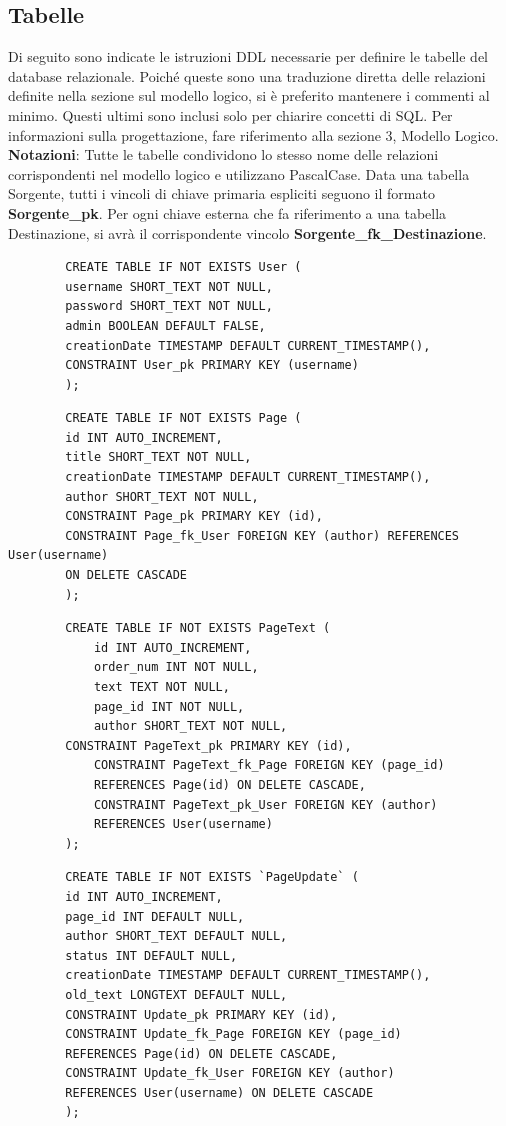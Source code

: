 \documentclass{article}
\begin{document}
	\subsection{Tabelle}
	Di seguito sono indicate le istruzioni DDL necessarie per definire le
	tabelle del database relazionale. Poiché queste sono una traduzione diretta delle
	relazioni definite nella sezione sul modello logico, si è preferito mantenere i
	commenti al minimo. Questi ultimi sono inclusi solo per chiarire concetti di SQL.
	Per informazioni sulla progettazione, fare riferimento alla sezione 3, Modello Logico.
	\\
	\textbf{Notazioni}: Tutte le tabelle condividono lo stesso nome delle relazioni
	corrispondenti nel modello logico e utilizzano PascalCase. Data una
	tabella Sorgente, tutti i vincoli di chiave primaria espliciti seguono il formato
	\textbf{Sorgente\_pk}. Per ogni chiave esterna che fa riferimento a una tabella
	Destinazione, si avrà il corrispondente vincolo \textbf{Sorgente\_fk\_Destinazione}.
	
	\begin{lstlisting}
		CREATE TABLE IF NOT EXISTS User (
		username SHORT_TEXT NOT NULL,
		password SHORT_TEXT NOT NULL,
		admin BOOLEAN DEFAULT FALSE,
		creationDate TIMESTAMP DEFAULT CURRENT_TIMESTAMP(),
		CONSTRAINT User_pk PRIMARY KEY (username)
		);
	\end{lstlisting}
		
	\begin{lstlisting}
		CREATE TABLE IF NOT EXISTS Page (
		id INT AUTO_INCREMENT,
		title SHORT_TEXT NOT NULL,
		creationDate TIMESTAMP DEFAULT CURRENT_TIMESTAMP(),
		author SHORT_TEXT NOT NULL,
		CONSTRAINT Page_pk PRIMARY KEY (id),
		CONSTRAINT Page_fk_User FOREIGN KEY (author) REFERENCES User(username)
		ON DELETE CASCADE
		);
	\end{lstlisting}
	
	\begin{lstlisting}
		CREATE TABLE IF NOT EXISTS PageText (
			id INT AUTO_INCREMENT,
			order_num INT NOT NULL,
			text TEXT NOT NULL,
			page_id INT NOT NULL,
			author SHORT_TEXT NOT NULL,
	    CONSTRAINT PageText_pk PRIMARY KEY (id),
			CONSTRAINT PageText_fk_Page FOREIGN KEY (page_id) 
			REFERENCES Page(id) ON DELETE CASCADE,
			CONSTRAINT PageText_pk_User FOREIGN KEY (author)
			REFERENCES User(username)
		);
	\end{lstlisting}
	
	
	\begin{lstlisting}
		CREATE TABLE IF NOT EXISTS `PageUpdate` (
		id INT AUTO_INCREMENT,
		page_id INT DEFAULT NULL,
		author SHORT_TEXT DEFAULT NULL,
		status INT DEFAULT NULL,
		creationDate TIMESTAMP DEFAULT CURRENT_TIMESTAMP(),
		old_text LONGTEXT DEFAULT NULL,
		CONSTRAINT Update_pk PRIMARY KEY (id),
		CONSTRAINT Update_fk_Page FOREIGN KEY (page_id)
		REFERENCES Page(id) ON DELETE CASCADE,
		CONSTRAINT Update_fk_User FOREIGN KEY (author)
		REFERENCES User(username) ON DELETE CASCADE
		);
	\end{lstlisting}
	
\end{document}
